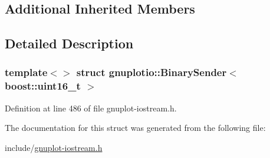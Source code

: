 \subsection*{Additional Inherited Members}


\subsection{Detailed Description}
\subsubsection*{template$<$$>$\newline
struct gnuplotio\+::\+Binary\+Sender$<$ boost\+::uint16\+\_\+t $>$}



Definition at line 486 of file gnuplot-\/iostream.\+h.



The documentation for this struct was generated from the following file\+:\begin{DoxyCompactItemize}
\item 
include/\hyperlink{gnuplot-iostream_8h}{gnuplot-\/iostream.\+h}\end{DoxyCompactItemize}
